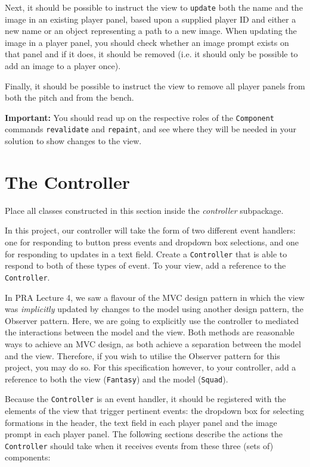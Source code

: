 \documentclass[11pt]{article}
\begin{document}
Next, it should be possible to instruct the view to \texttt{update} both the name and the image in an existing player panel, based upon a supplied player ID and either a new name or an object representing a path to a new image. When updating the image in a player panel, you should check whether an image prompt exists on that panel and if it does, it should be removed (i.e. it should only be possible to add an image to a player once).

Finally, it should be possible to instruct the view to remove all player panels from both the pitch and from the bench.

\textbf{Important:} You should read up on the respective roles of the \texttt{Component} commands \texttt{revalidate} and \texttt{repaint}, and see where they will be needed in your solution to show changes to the view. 

\section{The Controller}
\label{sec:controller}

Place all classes constructed in this section inside the \emph{controller} subpackage.

In this project, our controller will take the form of two different event handlers: one for responding to button press events and dropdown box selections, and one for responding to updates in a text field. Create a \texttt{Controller} that is able to respond to both of these types of event. To your view, add a reference to the \texttt{Controller}.

In PRA Lecture 4, we saw a flavour of the MVC design pattern in which the view was \emph{implicitly} updated by changes to the model using another design pattern, the Observer pattern. Here, we are going to explicitly use the controller to mediated the interactions between the model and the view. Both methods are reasonable ways to achieve an MVC design, as both achieve a separation between the model and the view. Therefore, if you wish to utilise the Observer pattern for this project, you may do so. For this specification however, to your controller, add a reference to both the view (\texttt{Fantasy}) and the model (\texttt{Squad}). 

Because the \texttt{Controller} is an event handler, it should be registered with the elements of the view that trigger pertinent events: the dropdown box for selecting formations in the header, the text field in each player panel and the image prompt in each player panel. The following sections describe the actions the \texttt{Controller} should take when it receives events from these three (sets of) components:
\end{document}
